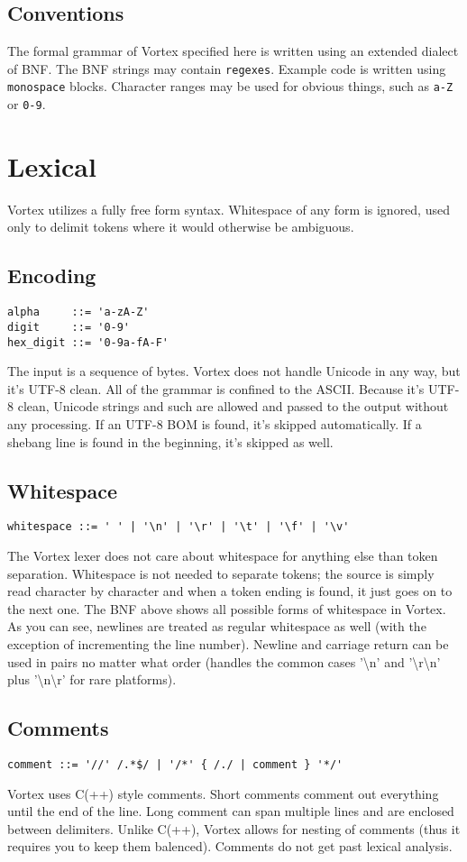 \documentclass{article}
\begin{document}
\subsection{Conventions}
The formal grammar of Vortex specified here is written using an extended dialect of BNF. The BNF strings may contain \verb|regexes|. Example code is written using \verb|monospace| blocks. Character ranges may be used for obvious things, such as \verb|a-Z| or \verb|0-9|.

\section{Lexical}
Vortex utilizes a fully free form syntax. Whitespace of any form is ignored, used only to delimit tokens where it would otherwise be ambiguous.
\subsection{Encoding}
\begin{lstlisting}[language=bnf]
alpha     ::= 'a-zA-Z'
digit     ::= '0-9'
hex_digit ::= '0-9a-fA-F'
\end{lstlisting}
The input is a sequence of bytes. Vortex does not handle Unicode in any way, but it's UTF-8 clean. All of the grammar is confined to the ASCII. Because it's UTF-8 clean, Unicode strings and such are allowed and passed to the output without any processing. If an UTF-8 BOM is found, it's skipped automatically. If a shebang line is found in the beginning, it's skipped as well.
\subsection{Whitespace}
\begin{lstlisting}[language=bnf]
whitespace ::= ' ' | '\n' | '\r' | '\t' | '\f' | '\v'
\end{lstlisting}
The Vortex lexer does not care about whitespace for anything else than token separation. Whitespace is not needed to separate tokens; the source is simply read character by character and when a token ending is found, it just goes on to the next one. The BNF above shows all possible forms of whitespace in Vortex. As you can see, newlines are treated as regular whitespace as well (with the exception of incrementing the line number). Newline and carriage return can be used in pairs no matter what order (handles the common cases '\textbackslash n' and '\textbackslash r\textbackslash n' plus '\textbackslash n\textbackslash r' for rare platforms).
\subsection{Comments}
\begin{lstlisting}[language=bnf]
comment ::= '//' /.*$/ | '/*' { /./ | comment } '*/'
\end{lstlisting}
Vortex uses C(++) style comments. Short comments comment out everything until the end of the line. Long comment can span multiple lines and are enclosed between delimiters. Unlike C(++), Vortex allows for nesting of comments (thus it requires you to keep them balenced). Comments do not get past lexical analysis.
\end{document}
